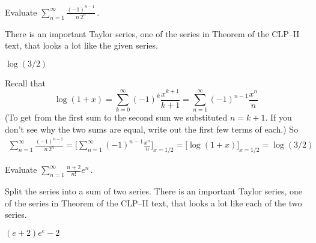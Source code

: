 \begin{Mquestion}[2012A]
Evaluate
${\displaystyle\sum_{n=1}^\infty\frac{(-1)^{n-1}}{n\, 2^n}}\,$.
\end{Mquestion}

\begin{hint}
There is an important Taylor series, one of the series in
Theorem  of the
CLP--II text, that looks a lot like the given series.
\end{hint}

\begin{answer}
$\log(3/2)$
\end{answer}

\begin{solution}
Recall that
\begin{equation*}
    \log(1+x) = \sum_{k=0}^\infty(-1)^k\frac{x^{k+1}}{k+1}
                    = \sum_{n=1}^\infty(-1)^{n-1}\frac{x^n}{n}
\end{equation*}
(To get from the first sum to the second sum we substituted $n=k+1$. If you don't see
why the two sums are equal, write out the first few terms of each.)
So
\begin{align*}
\sum_{n=1}^\infty\frac{(-1)^{n-1}}{n\, 2^n}
=\Big[\sum_{n=1}^\infty(-1)^{n-1}\frac{x^n}{n}\Big]_{x=1/2}
=\Big[\log(1+x)\Big]_{x=1/2}
=\log(3/2)
\end{align*}
\end{solution}


\begin{Mquestion}[M121 2012A]
Evaluate
${\displaystyle\sum_{n=1}^\infty\frac{n+2}{n!}e^n}\,$.
\end{Mquestion}

\begin{hint}
Split the series into a sum of two series.
There is an important Taylor series, one of the series in
Theorem  of the
CLP--II text, that looks a lot like each of the two series.
\end{hint}

\begin{answer}
$(e+2)e^e-2$
\end{answer}

